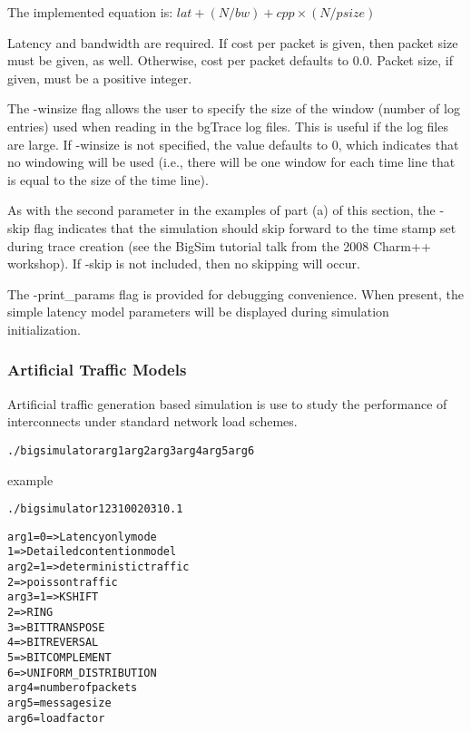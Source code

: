 The implemented equation is: $lat + (N/bw) + cpp \times (N/psize)$

Latency and bandwidth are required.  If cost per packet is given, then packet
size must be given, as well.  Otherwise, cost per packet defaults to 0.0.
Packet size, if given, must be a positive integer.

The -winsize flag allows the user to specify the size of the window (number of
log entries) used when reading in the bgTrace log files.  This is useful if the
log files are large.  If -winsize is not specified, the value defaults to 0,
which indicates that no windowing will be used (i.e., there will be one window
for each time line that is equal to the size of the time line).

As with the second parameter in the examples of part (a) of this section, the
-skip flag indicates that the simulation should skip forward to the time stamp
set during trace creation (see the BigSim tutorial talk from the 2008 Charm++
workshop).  If -skip is not included, then no skipping will occur.

The -print\_params flag is provided for debugging convenience.  When present,
the simple latency model parameters will be displayed during simulation
initialization.

\subsubsection{Artificial Traffic Models}
Artificial traffic generation based simulation is use to study the performance
of interconnects under standard network load schemes.

\begin{alltt}
  ./bigsimulator arg1 arg2 arg3 arg4 arg5 arg6
\end{alltt}
example
\begin{alltt}
  ./bigsimulator 1 2 3 100 2031 0.1
\end{alltt}

\begin{alltt}
  arg1 = 0 => Latency only mode
         1 => Detailed contention model
  arg2 = 1 => deterministic traffic
         2 => poisson traffic
  arg3 = 1 => KSHIFT
         2 => RING
         3 => BITTRANSPOSE
         4 => BITREVERSAL
         5 => BITCOMPLEMENT
         6 => UNIFORM\_DISTRIBUTION
  arg4 = number of packets
  arg5 = message size
  arg6 = load factor
\end{alltt}
